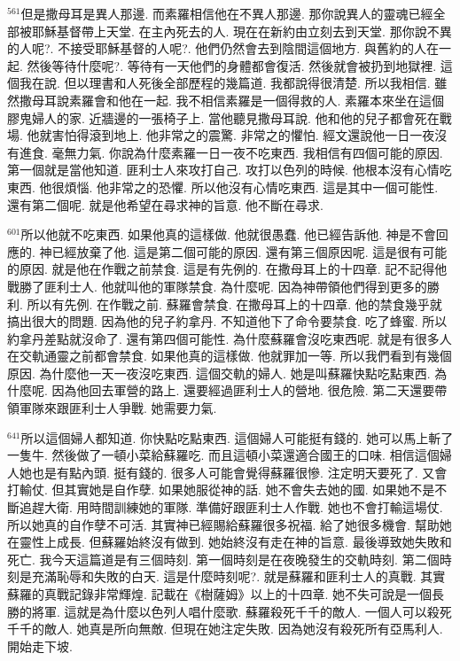 \documentclass{book}
\begin{document}
$^{561}$但是撒母耳是異人那邊.
而素羅相信他在不異人那邊.
那你說異人的靈魂已經全部被耶穌基督帶上天堂.
在主內死去的人.
現在在新約由立刻去到天堂.
那你說不異的人呢?.
不接受耶穌基督的人呢?.
他們仍然會去到陰間這個地方.
與舊約的人在一起.
然後等待什麼呢?.
等待有一天他們的身體都會復活.
然後就會被扔到地獄裡.
這個我在說.
但以理書和人死後全部歷程的幾篇道.
我都說得很清楚.
所以我相信.
雖然撒母耳說素羅會和他在一起.
我不相信素羅是一個得救的人.
素羅本來坐在這個膠鬼婦人的家.
近牆邊的一張椅子上.
當他聽見撒母耳說.
他和他的兒子都會死在戰場.
他就害怕得滾到地上.
他非常之的震驚.
非常之的懼怕.
經文還說他一日一夜沒有進食.
毫無力氣.
你說為什麼素羅一日一夜不吃東西.
我相信有四個可能的原因.
第一個就是當他知道.
匪利士人來攻打自己.
攻打以色列的時候.
他根本沒有心情吃東西.
他很煩惱.
他非常之的恐懼.
所以他沒有心情吃東西.
這是其中一個可能性.
還有第二個呢.
就是他希望在尋求神的旨意.
他不斷在尋求.

$^{601}$所以他就不吃東西.
如果他真的這樣做.
他就很愚蠢.
他已經告訴他.
神是不會回應的.
神已經放棄了他.
這是第二個可能的原因.
還有第三個原因呢.
這是很有可能的原因.
就是他在作戰之前禁食.
這是有先例的.
在撒母耳上的十四章.
記不記得他戰勝了匪利士人.
他就叫他的軍隊禁食.
為什麼呢.
因為神帶領他們得到更多的勝利.
所以有先例.
在作戰之前.
蘇羅會禁食.
在撒母耳上的十四章.
他的禁食幾乎就搞出很大的問題.
因為他的兒子約拿丹.
不知道他下了命令要禁食.
吃了蜂蜜.
所以約拿丹差點就沒命了.
還有第四個可能性.
為什麼蘇羅會沒吃東西呢.
就是有很多人在交軌通靈之前都會禁食.
如果他真的這樣做.
他就罪加一等.
所以我們看到有幾個原因.
為什麼他一天一夜沒吃東西.
這個交軌的婦人.
她是叫蘇羅快點吃點東西.
為什麼呢.
因為他回去軍營的路上.
還要經過匪利士人的營地.
很危險.
第二天還要帶領軍隊來跟匪利士人爭戰.
她需要力氣.

$^{641}$所以這個婦人都知道.
你快點吃點東西.
這個婦人可能挺有錢的.
她可以馬上斬了一隻牛.
然後做了一頓小菜給蘇羅吃.
而且這頓小菜還適合國王的口味.
相信這個婦人她也是有點內頭.
挺有錢的.
很多人可能會覺得蘇羅很慘.
注定明天要死了.
又會打輸仗.
但其實她是自作孽.
如果她服從神的話.
她不會失去她的國.
如果她不是不斷追趕大衛.
用時間訓練她的軍隊.
準備好跟匪利士人作戰.
她也不會打輸這場仗.
所以她真的自作孽不可活.
其實神已經賜給蘇羅很多祝福.
給了她很多機會.
幫助她在靈性上成長.
但蘇羅始終沒有做到.
她始終沒有走在神的旨意.
最後導致她失敗和死亡.
我今天這篇道是有三個時刻.
第一個時刻是在夜晚發生的交軌時刻.
第二個時刻是充滿恥辱和失敗的白天.
這是什麼時刻呢?.
就是蘇羅和匪利士人的真戰.
其實蘇羅的真戰記錄非常輝煌.
記載在《樹薩姆》以上的十四章.
她不失可說是一個長勝的將軍.
這就是為什麼以色列人唱什麼歌.
蘇羅殺死千千的敵人.
一個人可以殺死千千的敵人.
她真是所向無敵.
但現在她注定失敗.
因為她沒有殺死所有亞馬利人.
開始走下坡.
\end{document}
